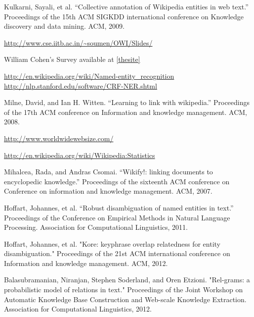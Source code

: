 \begin{thebibliography}{9}

 \label{thepaper} Kulkarni, Sayali, et al. ``Collective annotation of Wikipedia entities in web text.'' Proceedings of the 15th ACM SIGKDD international conference on Knowledge discovery and data mining. ACM, 2009.

  \label{thesite} \url{http://www.cse.iitb.ac.in/~soumen/OWI/Slides/}

 \label{thesurvey} William Cohen's Survey available at \ref{thesite}

 \label{thewiki} \url{http://en.wikipedia.org/wiki/Named-entity_recognition}
 \label{stanfordner} \url{http://nlp.stanford.edu/software/CRF-NER.shtml}


\label{mw}
Milne, David, and Ian H. Witten. ``Learning to link with wikipedia.'' Proceedings of the 17th ACM conference on Information and knowledge management. ACM, 2008.

 \label{ws} \url{http://www.worldwidewebsize.com/}

 \label{wikistats} \url{http://en.wikipedia.org/wiki/Wikipedia:Statistics}

 \label{wikify}
Mihalcea, Rada, and Andras Csomai. ``Wikify!: linking documents to encyclopedic knowledge.'' Proceedings of the sixteenth ACM conference on Conference on information and knowledge management. ACM, 2007.

 \label{aida}
Hoffart, Johannes, et al. ``Robust disambiguation of named entities in text.'' Proceedings of the Conference on Empirical Methods in Natural Language Processing. Association for Computational Linguistics, 2011.

 \label{kpsim}
Hoffart, Johannes, et al. "Kore: keyphrase overlap relatedness for entity disambiguation." Proceedings of the 21st ACM international conference on Information and knowledge management. ACM, 2012.

 \label{relgram}
Balasubramanian, Niranjan, Stephen Soderland, and Oren Etzioni. "Rel-grams: a probabilistic model of relations in text." Proceedings of the Joint Workshop on Automatic Knowledge Base Construction and Web-scale Knowledge Extraction. Association for Computational Linguistics, 2012.
\end{thebibliography}